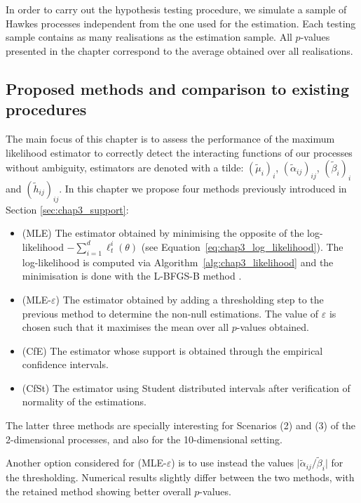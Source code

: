     In order to carry out the hypothesis testing procedure, we simulate a sample of Hawkes processes independent from the one used for the estimation. Each testing sample contains as many realisations as the estimation sample. All $p$-values presented in the chapter correspond to the average obtained over all realisations.

    \subsection{Proposed methods and comparison to existing procedures}
    \label{sec:chap3_description_methods}
    The main focus of this chapter is to assess the performance of the maximum likelihood estimator to correctly detect the interacting functions of our processes without ambiguity, estimators are denoted with a tilde: $(\tilde\mu_i)_i$, $(\tilde\alpha_{ij})_{ij}$, $(\tilde\beta_i)_i$ and \((\tilde h_{ij})_{ij}\).
    In this chapter we propose four methods previously introduced in Section \ref{sec:chap3_support}:
    \begin{itemize}
        \item (MLE) The estimator obtained by minimising the opposite of the log-likelihood $-\sum_{i=1}^{d}{\ell_t^i(\theta)}$ (see Equation~\eqref{eq:chap3_log_likelihood}). The log-likelihood is computed via Algorithm~\ref{alg:chap3_likelihood} and the minimisation is done with the L-BFGS-B method \parencite{Byrd1995}.
        \item (MLE-$\varepsilon$) The estimator obtained by adding a thresholding step to the previous method to determine the non-null estimations.  The value of $\varepsilon$ is chosen such that it maximises the mean over all $p$-values obtained.
        \item (CfE) The estimator whose support is obtained through the empirical confidence intervals.
        \item (CfSt) The estimator using Student distributed intervals after verification of normality of the estimations.
    \end{itemize}

    The latter three methods are specially interesting for Scenarios (2) and (3) of the 2-dimensional processes, and also for the 10-dimensional setting.

    \begin{remark}
    Another option considered for (MLE-$\varepsilon$) is to use instead the values $\lvert\tilde \alpha_{ij} / \tilde \beta_{i}\rvert$ for the thresholding. Numerical results slightly differ between the two methods, with the retained method showing better overall $p$-values.
    \end{remark}

